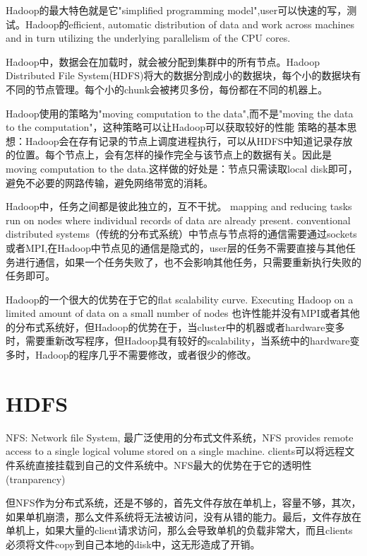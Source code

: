 Hadoop的最大特色就是它"simplified programming model",user可以快速的写，测试。Hadoop的efficient, automatic distribution of data and work across machines and in turn utilizing the underlying parallelism of the CPU cores.

Hadoop中，数据会在加载时，就会被分配到集群中的所有节点。Hadoop Distributed File System(HDFS)将大的数据分割成小的数据块，每个小的数据块有不同的节点管理。每个小的chunk会被拷贝多份，每份都在不同的机器上。

Hadoop使用的策略为"moving computation to the data",而不是"moving the data to the computation"，这种策略可以让Hadoop可以获取较好的性能
策略的基本思想：Hadoop会在存有记录的节点上调度进程执行，可以从HDFS中知道记录存放的位置。每个节点上，会有怎样的操作完全与该节点上的数据有关。因此是moving computation to the data.这样做的好处是：节点只需读取local disk即可，避免不必要的网路传输，避免网络带宽的消耗。


Hadoop中，任务之间都是彼此独立的，互不干扰。
mapping and reducing tasks run on nodes where individual records of data are already present.
conventional distributed systems（传统的分布式系统）中节点与节点将的通信需要通过sockets或者MPI,在Hadoop中节点见的通信是隐式的，user层的任务不需要直接与其他任务进行通信，如果一个任务失败了，也不会影响其他任务，只需要重新执行失败的任务即可。

Hadoop的一个很大的优势在于它的flat scalability curve.
Executing Hadoop on a limited amount of data on a small number of nodes 也许性能并没有MPI或者其他的分布式系统好，但Hadoop的优势在于，当cluster中的机器或者hardware变多时，需要重新改写程序，但Hadoop具有较好的scalability，当系统中的hardware变多时，Hadoop的程序几乎不需要修改，或者很少的修改。

\section{HDFS}
NFS: Network file System, 最广泛使用的分布式文件系统，NFS provides remote access to a single logical volume stored on a single machine. clients可以将远程文件系统直接挂载到自己的文件系统中。NFS最大的优势在于它的透明性(tranparency)

但NFS作为分布式系统，还是不够的，首先文件存放在单机上，容量不够，其次，如果单机崩溃，那么文件系统将无法被访问，没有从错的能力。最后，文件存放在单机上，如果大量的client请求访问，那么会导致单机的负载非常大，而且clients必须将文件copy到自己本地的disk中，这无形造成了开销。

